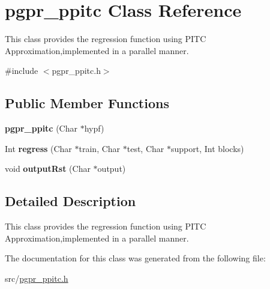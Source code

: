 \hypertarget{classpgpr__ppitc}{\section{pgpr\-\_\-ppitc Class Reference}
\label{classpgpr__ppitc}
}


This class provides the regression function using P\-I\-T\-C Approximation,implemented in a parallel manner.  




{\ttfamily \#include $<$pgpr\-\_\-ppitc.\-h$>$}

\subsection*{Public Member Functions}
\begin{DoxyCompactItemize}
\item 
\hypertarget{classpgpr__ppitc_a657669cbcb5919400802afeee866de17}{{\bfseries pgpr\-\_\-ppitc} (Char $\ast$hypf)}\label{classpgpr__ppitc_a657669cbcb5919400802afeee866de17}

\item 
\hypertarget{classpgpr__ppitc_aa72c1ee9f5004f7c97920793be7246dd}{Int {\bfseries regress} (Char $\ast$train, Char $\ast$test, Char $\ast$support, Int blocks)}\label{classpgpr__ppitc_aa72c1ee9f5004f7c97920793be7246dd}

\item 
\hypertarget{classpgpr__ppitc_ad00170745bce09f304adffbfe5d09cd2}{void {\bfseries output\-Rst} (Char $\ast$output)}\label{classpgpr__ppitc_ad00170745bce09f304adffbfe5d09cd2}

\end{DoxyCompactItemize}


\subsection{Detailed Description}
This class provides the regression function using P\-I\-T\-C Approximation,implemented in a parallel manner. 

The documentation for this class was generated from the following file\-:\begin{DoxyCompactItemize}
\item 
src/\hyperlink{pgpr__ppitc_8h}{pgpr\-\_\-ppitc.\-h}\end{DoxyCompactItemize}
